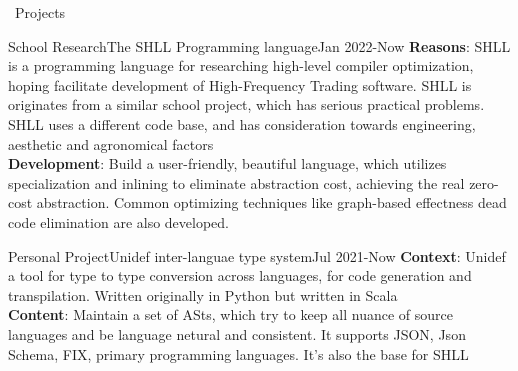 \documentclass{resume}
\begin{document}
\begin{rSection}{\faUsers~Projects}
    \begin{rProject}{School Research}{The SHLL Programming language}{Jan 2022-Now}
        \textbf{Reasons}: SHLL is a programming language for researching high-level compiler optimization, hoping facilitate development of High-Frequency Trading software. SHLL is originates from a similar school project, which has serious practical problems. SHLL uses a different code base, and has consideration towards  engineering, aesthetic and agronomical factors\\
        \textbf{Development}: Build a user-friendly, beautiful language, which utilizes specialization and inlining to eliminate abstraction cost, achieving the real zero-cost abstraction. Common optimizing techniques like graph-based effectness dead code elimination are also developed.
    \end{rProject}
    \begin{rProject}{Personal Project}{Unidef inter-languae type system}{Jul 2021-Now}
        \textbf{Context}: Unidef a tool for type to type conversion across languages, for code generation and transpilation. Written originally in Python but written in Scala\\
        \textbf{Content}: Maintain a set of ASts, which try to keep all nuance of source languages and be language netural and consistent. It supports JSON, Json Schema, FIX, primary programming languages. It's also the base for SHLL
    \end{rProject}


\end{rSection}
\end{document}
